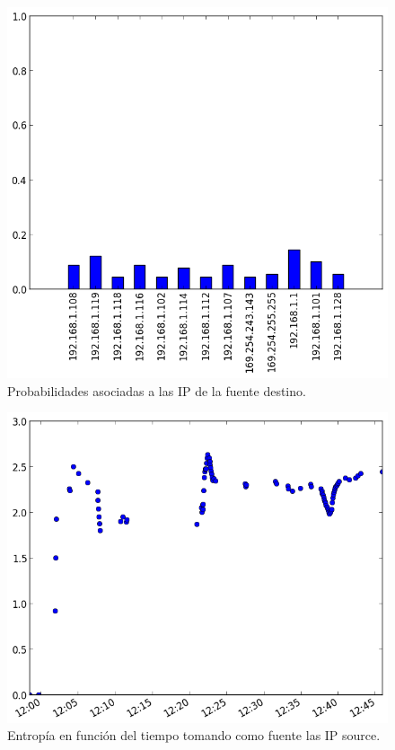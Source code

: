 \begin{figure}[H]
  \centering
	\includegraphics[scale=0.66]{../experimentacion-barbeiton/histogram_dst_probabilities.png}
  \caption{Probabilidades asociadas a las IP de la fuente destino.}
\end{figure}

\begin{figure}[H]
  \centering	
	\includegraphics[scale=0.66]{../experimentacion-barbeiton/entropy_src.png}
  \caption{Entropía en función del tiempo tomando como fuente las IP source.}
\end{figure}


